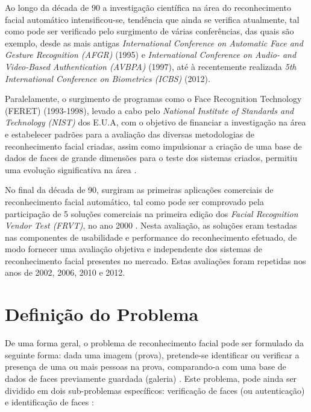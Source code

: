 Ao longo da década de 90 a investigação científica na área do reconhecimento facial automático intensificou-se, tendência que ainda se verifica atualmente, tal como pode ser verificado pelo surgimento de várias conferências, das quais são exemplo, desde as mais antigas
\textit{International Conference on Automatic Face and Gesture Recognition (AFGR)} (1995) e \textit{International Conference on Audio- and Video-Based Authentication (AVBPA)} (1997), até à recentemente realizada \textit{5th International Conference on Biometrics (ICBS)} (2012).

Paralelamente, o surgimento de programas como o Face Recognition Technology (FERET) (1993-1998), levado a cabo pelo \textit{National Institute of Standards and Technology (NIST)} dos E.U.A, com o objetivo de financiar a investigação na área e estabelecer padrões para a avaliação das diversas metodologias de reconhecimento facial criadas, assim como impulsionar a criação de uma base de dados de faces de grande dimensões para o teste dos sistemas criados, permitiu uma evolução significativa na área \citep{Phillips1998, Phillips2000}.

No final da década de 90, surgiram as primeiras aplicações comerciais de reconhecimento facial automático, tal como pode ser comprovado  pela participação de 5 soluções comerciais na primeira edição dos \textit{Facial Recognition Vendor Test (FRVT)}, no ano 2000 \citep{BlackburnDuaneM.;BoneMike;Phillips2001}. Nesta avaliação, as soluções eram testadas nas componentes de usabilidade e performance do reconhecimento efetuado, de modo fornecer uma avaliação objetiva e independente dos sistemas de reconhecimento facial presentes no mercado. Estas avaliações foram repetidas nos anos de 2002, 2006, 2010 e 2012.

\section{Definição do Problema} \label{sec:problema}
De uma forma geral, o problema de reconhecimento facial pode ser formulado da seguinte forma: dada uma imagem (prova), pretende-se identificar ou verificar a presença de uma ou mais pessoas na prova, comparando-a com uma base de dados de faces previamente guardada (galeria) \citep{Yang2002, Zhao2003}. Este problema, pode ainda ser dividido em dois sub-problemas específicos: verificação de faces (ou autenticação) e identificação de faces \citep{Li2011}:

